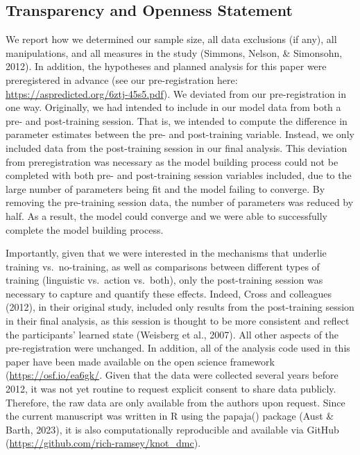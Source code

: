 \documentclass[
  man, donotrepeattitle,floatsintext]{apa6}
\begin{document}
\subsection{Transparency and Openness Statement}\label{transparency-and-openness-statement}

We report how we determined our sample size, all data exclusions (if any), all manipulations, and all measures in the study (Simmons, Nelson, \& Simonsohn, 2012). In addition, the hypotheses and planned analysis for this paper were preregistered in advance (see our pre-registration here: \url{https://aspredicted.org/6ztj-45s5.pdf}). We deviated from our pre-registration in one way. Originally, we had intended to include in our model data from both a pre- and post-training session. That is, we intended to compute the difference in parameter estimates between the pre- and post-training variable. Instead, we only included data from the post-training session in our final analysis. This deviation from preregistration was necessary as the model building process could not be completed with both pre- and post-training session variables included, due to the large number of parameters being fit and the model failing to converge. By removing the pre-training session data, the number of parameters was reduced by half. As a result, the model could converge and we were able to successfully complete the model building process.

Importantly, given that we were interested in the mechanisms that underlie training vs.~no-training, as well as comparisons between different types of training (linguistic vs.~action vs.~both), only the post-training session was necessary to capture and quantify these effects. Indeed, Cross and colleagues (2012), in their original study, included only results from the post-training session in their final analysis, as this session is thought to be more consistent and reflect the participants' learned state (Weisberg et al., 2007). All other aspects of the pre-registration were unchanged. In addition, all of the analysis code used in this paper have been made available on the open science framework (\url{https://osf.io/ea6gk/}. Given that the data were collected several years before 2012, it was not yet routine to request explicit consent to share data publicly. Therefore, the raw data are only available from the authors upon request. Since the current manuscript was written in R using the papaja() package (Aust \& Barth, 2023), it is also computationally reproducible and available via GitHub (\url{https://github.com/rich-ramsey/knot_dmc}).
\end{document}
